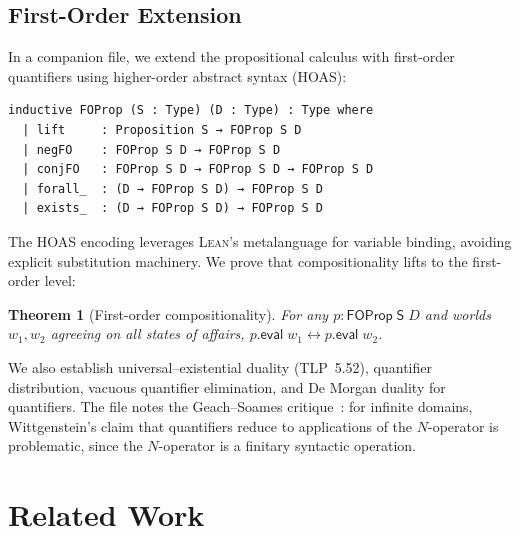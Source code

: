 \documentclass[10pt, letterpaper]{article}
\newtheorem{theorem}{Theorem}[section]
\theoremstyle{definition}
\theoremstyle{remark}
\newcommand{\Sach}{\mathsf{S}}
\newcommand{\eval}{\mathsf{eval}}
\newcommand{\Lean}{\textsc{Lean}}
\begin{document}
\subsection{First-Order Extension}
\label{sec:firstorder}

In a companion file, we extend the propositional calculus with
first-order quantifiers using higher-order abstract syntax
(HOAS):

\begin{lstlisting}
inductive FOProp (S : Type) (D : Type) : Type where
  | lift     : Proposition S → FOProp S D
  | negFO    : FOProp S D → FOProp S D
  | conjFO   : FOProp S D → FOProp S D → FOProp S D
  | forall_  : (D → FOProp S D) → FOProp S D
  | exists_  : (D → FOProp S D) → FOProp S D
\end{lstlisting}

\noindent
The HOAS encoding leverages \Lean's metalanguage for variable
binding, avoiding explicit substitution machinery.  We prove
that compositionality lifts to the first-order level:

\begin{theorem}[First-order compositionality]
\label{thm:fo-comp}
For any $p : \mathsf{FOProp}\;\Sach\;D$ and worlds $w_1, w_2$
agreeing on all states of affairs, $p.\eval\;w_1 \leftrightarrow
p.\eval\;w_2$.
\end{theorem}

\noindent
We also establish universal--existential duality (TLP~5.52),
quantifier distribution, vacuous quantifier elimination, and De
Morgan duality for quantifiers.  The file notes the
Geach--Soames critique~\cite{geach1981,soames1983}: for infinite
domains, Wittgenstein's claim that quantifiers reduce to
applications of the $N$-operator is problematic, since the
$N$-operator is a finitary syntactic operation.

\section{Related Work}
\label{sec:related}
\end{document}
